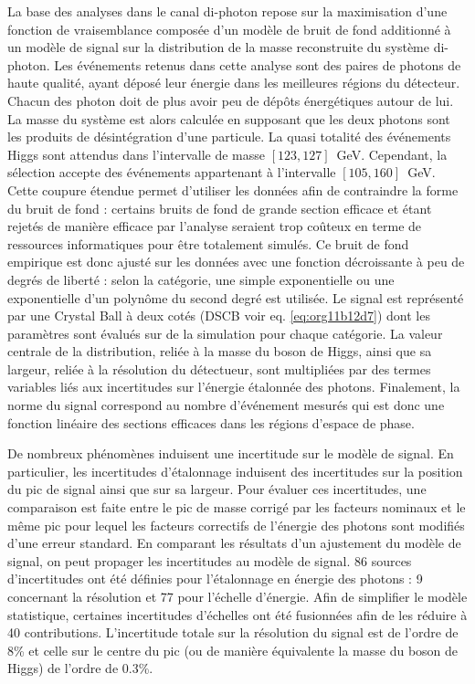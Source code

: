 La base des analyses dans le canal di-photon repose sur la maximisation d'une fonction de vraisemblance composée d'un modèle de bruit de fond additionné à un modèle de signal sur la distribution de la masse reconstruite du système di-photon.
Les événements retenus dans cette analyse sont des paires de photons de haute qualité, ayant déposé leur énergie dans les meilleures régions du détecteur.
Chacun des photon doit de plus avoir peu de dépôts énergétiques autour de lui.
La masse du système est alors calculée en supposant que les deux photons sont les produits de désintégration d'une particule.
La quasi totalité des événements Higgs sont attendus dans l'intervalle de masse $[123, 127]$~GeV.
Cependant, la sélection accepte des événements appartenant à l'intervalle $[105, 160]$~GeV.
Cette coupure étendue permet d'utiliser les données afin de contraindre la forme du bruit de fond : certains bruits de fond de grande section efficace et étant rejetés de manière efficace par l'analyse seraient trop coûteux en terme de ressources informatiques pour être totalement simulés.
Ce bruit de fond empirique est donc ajusté sur les données avec une fonction décroissante à peu de degrés de liberté : selon la catégorie, une simple exponentielle ou une exponentielle d'un polynôme du second degré est utilisée.
Le signal est représenté par une Crystal Ball à deux cotés (DSCB voir eq. \ref{eq:org11b12d7}) dont les paramètres sont évalués sur de la simulation pour chaque catégorie.
La valeur centrale de la distribution, reliée à la masse du boson de Higgs, ainsi que sa largeur, reliée à la résolution du détectueur, sont multipliées par des termes variables liés aux incertitudes sur l'énergie étalonnée des photons.
Finalement, la norme du signal correspond au nombre d'événement mesurés qui est donc une fonction linéaire des sections efficaces dans les régions d'espace de phase.

De nombreux phénomènes induisent une incertitude sur le modèle de signal.
En particulier, les incertitudes d'étalonnage induisent des incertitudes sur la position du pic de signal ainsi que sur sa largeur.
Pour évaluer ces incertitudes, une comparaison est faite entre le pic de masse corrigé par les facteurs nominaux et le même pic pour lequel les facteurs correctifs de l'énergie des photons sont modifiés d'une erreur standard.
En comparant les résultats d'un ajustement du modèle de signal, on peut propager les incertitudes au modèle de signal.
86 sources d'incertitudes ont été définies pour l'étalonnage en énergie des photons : 9 concernant la résolution et 77 pour l'échelle d'énergie.
Afin de simplifier le modèle statistique, certaines incertitudes d'échelles ont été fusionnées afin de les réduire à 40 contributions.
L'incertitude totale sur la résolution du signal est de l'ordre de 8\% et celle sur le centre du pic (ou de manière équivalente la masse du boson de Higgs) de l'ordre de 0.3\%.

